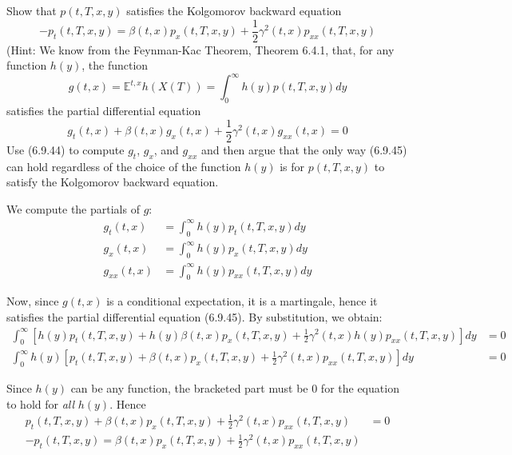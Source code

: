 \documentclass{article}
\newcommand{\E}{\mathbb{E}}
\theoremstyle{definition}
\theoremstyle{definition}
\begin{document}
\begin{enumerate}
 Show that $p(t,T,x,y)$ satisfies the Kolgomorov backward equation
 \begin{equation}
     -p_t(t,T,x,y)= \beta(t,x) p_x(t,T,x,y)+ \frac{1}{2}\gamma^2(t,x) p_{xx}(t,T,x,y) \tag{6.9.43}
 \end{equation}
(Hint: We know from the Feynman-Kac Theorem, Theorem 6.4.1, that, for any function $h(y)$, the function
\begin{equation}
    g(t,x) = \E^{t,x}h(X(T)) = \int_0^\infty h(y) p(t,T,x,y)dy \tag{6.9.44}
\end{equation}
satisfies the partial differential equation
\begin{equation}
    g_t(t,x) + \beta(t,x)g_x(t,x) + \frac{1}{2}\gamma^2(t,x) g_{xx}(t,x) = 0 \tag{6.9.45}
\end{equation}
Use (6.9.44) to compute $g_t$, $g_x$, and $g_{xx}$ and then argue that the only way (6.9.45) can hold regardless of the choice of the function $h(y)$ is for $p(t,T,x,y)$ to satisfy the Kolgomorov backward equation.

We compute the partials of $g$:
\begin{align*}
    g_t(t,x) &= \int_0^\infty h(y) p_t(t,T,x,y) dy \\
    g_x(t,x) &= \int_0^\infty h(y) p_x(t,T,x,y) dy \\
    g_{xx}(t,x) &= \int_0^\infty h(y) p_{xx}(t,T,x,y) dy 
\end{align*}

Now, since $g(t,x)$ is a conditional expectation, it is a martingale, hence it satisfies the partial differential equation (6.9.45). By substitution, we obtain:
\begin{align*}
    \int_0^\infty \left[ h(y) p_t(t,T,x,y) + h(y) \beta(t,x)p_x(t,T,x,y) + \frac{1}{2} \gamma^2(t,x)h(y) p_{xx}(t,T,x,y)  \right] dy &= 0 \\
    \int_0^\infty h(y)\left[  p_t(t,T,x,y) + \beta(t,x) p_x(t,T,x,y) +  \frac{1}{2} \gamma^2(t,x)p_{xx}(t,T,x,y)  \right] dy &=0 
\end{align*}

Since $h(y)$ can be any function, the bracketed part must be $0$ for the equation to hold for \textit{all} $h(y)$. Hence
\begin{align*}
      p_t(t,T,x,y) + \beta(t,x) p_x(t,T,x,y) +  \frac{1}{2} \gamma^2(t,x)p_{xx}(t,T,x,y)   &= 0 \\
      - p_t(t,T,x,y) = \beta(t,x) p_x(t,T,x,y) +  \frac{1}{2} \gamma^2(t,x)p_{xx}(t,T,x,y)    \\
\end{align*}


\end{enumerate}
\end{document}
